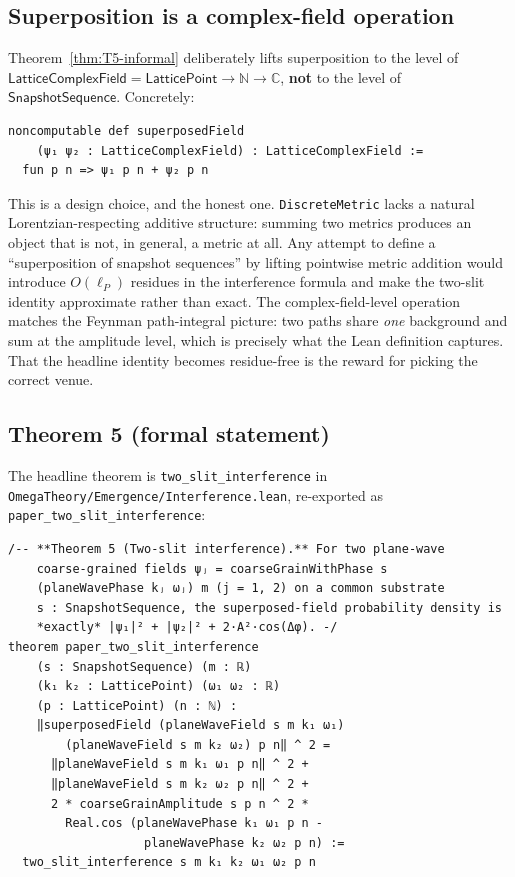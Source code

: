 \documentclass[11pt,a4paper,twoside]{article}
\theoremstyle{definition}
\newcommand{\Cbb}{\mathbb{C}}
\newcommand{\Nbb}{\mathbb{N}}
\newcommand{\lP}{\ell_P}
\newcommand{\Lfield}{\mathsf{LatticeComplexField}}
\newcommand{\SnapSeq}{\mathsf{SnapshotSequence}}
\newcommand{\code}[1]{\texttt{#1}}
\begin{document}
\subsection{Superposition is a complex-field operation}\label{sec:interference-design}

Theorem~\ref{thm:T5-informal} deliberately lifts superposition to the
level of $\Lfield=\mathsf{LatticePoint}\to\Nbb\to\Cbb$, \textbf{not} to
the level of $\SnapSeq$. Concretely:
\begin{lstlisting}
noncomputable def superposedField
    (ψ₁ ψ₂ : LatticeComplexField) : LatticeComplexField :=
  fun p n => ψ₁ p n + ψ₂ p n
\end{lstlisting}

This is a design choice, and the honest one. \code{DiscreteMetric}
lacks a natural Lorentzian-respecting additive structure: summing two
metrics produces an object that is not, in general, a metric at all.
Any attempt to define a ``superposition of snapshot sequences'' by
lifting pointwise metric addition would introduce $O(\lP)$ residues
in the interference formula and make the two-slit identity
approximate rather than exact. The complex-field-level operation
matches the Feynman path-integral picture: two paths share
\emph{one} background and sum at the amplitude level, which is
precisely what the Lean definition captures. That the headline
identity becomes residue-free is the reward for picking the correct
venue.

\subsection{Theorem 5 (formal statement)}\label{sec:T5}

The headline theorem is \code{two\_slit\_interference} in
\code{OmegaTheory/Emergence/Interference.lean}, re-exported as
\code{paper\_two\_slit\_interference}:
\begin{lstlisting}
/-- **Theorem 5 (Two-slit interference).** For two plane-wave
    coarse-grained fields ψⱼ = coarseGrainWithPhase s
    (planeWavePhase kⱼ ωⱼ) m (j = 1, 2) on a common substrate
    s : SnapshotSequence, the superposed-field probability density is
    *exactly* |ψ₁|² + |ψ₂|² + 2·A²·cos(Δφ). -/
theorem paper_two_slit_interference
    (s : SnapshotSequence) (m : ℝ)
    (k₁ k₂ : LatticePoint) (ω₁ ω₂ : ℝ)
    (p : LatticePoint) (n : ℕ) :
    ‖superposedField (planeWaveField s m k₁ ω₁)
        (planeWaveField s m k₂ ω₂) p n‖ ^ 2 =
      ‖planeWaveField s m k₁ ω₁ p n‖ ^ 2 +
      ‖planeWaveField s m k₂ ω₂ p n‖ ^ 2 +
      2 * coarseGrainAmplitude s p n ^ 2 *
        Real.cos (planeWavePhase k₁ ω₁ p n -
                   planeWavePhase k₂ ω₂ p n) :=
  two_slit_interference s m k₁ k₂ ω₁ ω₂ p n
\end{lstlisting}
\end{document}
